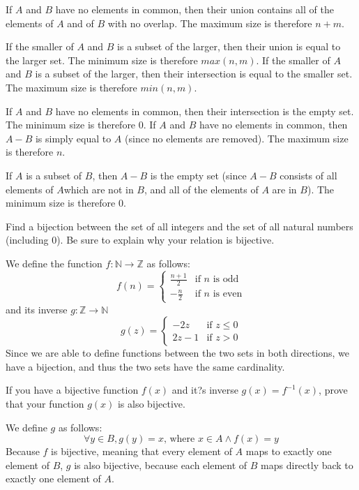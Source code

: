 \documentclass[solution, letterpaper]{cs20}
\begin{document}
\begin{solution}
\subsolution If $A$ and $B$ have no elements in common, then their union contains all of the elements of $A$ and of $B$ with no overlap. The maximum size is therefore $n + m$. 

\noindent If the smaller of $A$ and $B$ is a subset of the larger, then their union is equal to the larger set. The minimum size is therefore $max(n, m)$.
\subsolution If the smaller of $A$ and $B$ is a subset of the larger, then their intersection is equal to the smaller set. The maximum size is therefore $min(n, m)$.

\noindent If $A$ and $B$ have no elements in common, then their intersection is the empty set. The minimum size is therefore 0.
\subsolution If $A$ and $B$ have no elements in common, then $A - B$ is simply equal to $A$ (since no elements are removed). The maximum size is therefore $n$.

\noindent If $A$ is a subset of $B$, then $A - B$ is the empty set (since $A - B$ consists of all elements of $A$which are not in $B$, and all of the elements of $A$ are in $B$). The minimum size is therefore 0.
\end{solution}

Find a bijection between the set of all integers and the set of all natural numbers (including 0). Be sure to explain why your relation is bijective.

\begin{solution}
We define the function $f:\mathbb{N} \to \mathbb{Z}$ as follows: 
$$f(n) = \begin{cases} \frac{n+1}{2} & \mbox{if }n\mbox{ is odd} \\ -\frac{n}{2} & \mbox{if }n\mbox{ is even} \end{cases}$$
and its inverse $g:\mathbb{Z} \to \mathbb{N}$
$$g(z) = \begin{cases} -2z & \mbox{if }z \leq 0 \\ 2z-1& \mbox{if }z > 0 \end{cases}$$
Since we are able to define functions between the two sets in both directions, we have a bijection, and thus the two sets have the same cardinality.
\end{solution}
 
 
If you have a bijective function $f(x)$ and it?s inverse $g(x) = f^{-1}(x)$, prove that your function $g(x)$ is also bijective.

\begin{solution}
\noindent We define $g$ as follows:
$$\forall y \in B, g(y) = x\text{, where }x \in A \wedge f(x) = y$$
\noindent Because $f$ is bijective, meaning that every element of $A$ maps to exactly one element of $B$, $g$ is also bijective, because each element of $B$ maps directly back to exactly one element of $A$.

\end{solution}
\end{document}
